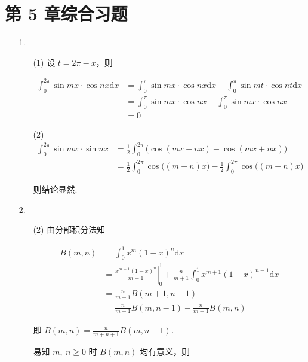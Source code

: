 \documentclass[oneside]{ctexbook} %
\begin{document}
\section*{第 5 章综合习题}

\begin{enumerate}
    \item[1.]
    \begin{enumerate}
        \item[(1)]
        设 $t = 2 \pi - x$，则
        
        $$
        \begin{aligned}
            \int_0^{2 \pi} \sin mx \cdot \cos nx \mathrm dx &= \int_0^\pi \sin mx \cdot \cos nx \mathrm dx + \int_0^\pi \sin mt \cdot \cos nt \mathrm dx \\
            &= \int_0^\pi \sin mx \cdot \cos nx - \int_0^\pi \sin mx \cdot \cos nx \\
            &= 0
        \end{aligned}
        $$
        \item[(2)]
        $$
        \begin{aligned}
            \int_0^{2\pi} \sin mx \cdot \sin nx &= \frac 1 2 \int_0^{2\pi} \bigg( \cos( mx - nx ) - \cos( mx + nx ) \bigg) \\
            &= \frac 1 2 \int_0^{2\pi} \cos\big( (m - n)x \big) - \frac 1 2 \int_0^{2\pi} \cos\big( (m + n)x \big)
        \end{aligned}
        $$
        
        则结论显然.
    \end{enumerate}
    \item[2.]
    \begin{enumerate}
        \item[(2)]
        由分部积分法知
        
        $$
        \begin{aligned}
            B(m, n) &= \int_0^1 x^m (1-x)^n \mathrm dx \\
            &= \left. \frac{x^{m+1}(1-x)^n}{m+1} \right|_0^1 + \frac n {m+1} \int_0^1 x^{m+1} (1-x)^{n-1} \mathrm dx \\
            &= \frac n {m+1} B(m+1, n-1) \\
            &= \frac n {m+1} B(m, n-1) - \frac n {m+1} B(m, n)
        \end{aligned}
        $$
        
        即 $B(m, n) = \frac n {m+n+1} B(m, n-1)$.
        
        易知 $m,\ n \geqslant 0$ 时 $B(m, n)$ 均有意义，则
        

\end{enumerate}
\end{enumerate}
\end{document}
